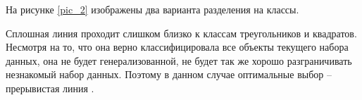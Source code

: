 \begin{figure} [H]
\end{figure}

На рисунке \ref{pic_2} изображены два варианта разделения на классы.

\begin{figure} [H]
\end{figure}

Сплошная линия проходит слишком близко к классам треугольников и квадратов. Несмотря на то, что она верно классифицировала все объекты текущего набора данных, она не будет генерализованной, не будет так же хорошо разграничивать незнакомый набор данных. Поэтому в данном случае оптимальные выбор -- прерывистая линия \cite{all}.

